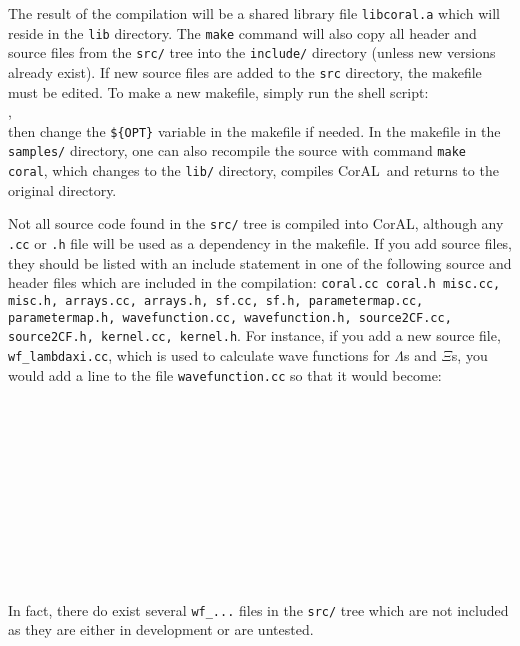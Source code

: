 \documentclass[10pt]{article}
\def\tab{\hspace*{9pt}}
\newcommand{\coral}{CorAL}
\begin{document}
The result of the compilation will be a shared library file {\tt libcoral.a} which will reside in the {\tt lib} directory. The {\tt make} command will also copy all header and source files from the {\tt src/} tree into the {\tt include/} directory (unless new versions already exist). If new source files are added to the {\tt src} directory, the makefile must be edited. To make a new makefile, simply run the shell script:\\
\tab {\tt makemaker.sh > makefile},\\
then change the {\tt \$\{OPT\}} variable in the makefile if needed. In the makefile in the {\tt samples/} directory, one can also recompile the source with command {\tt make coral}, which changes to the {\tt lib/} directory, compiles \coral\ and returns to the original directory.

Not all source code found in the {\tt src/} tree is compiled into \coral, although any {\tt *.cc} or {\tt *.h} file will be used as a dependency in the makefile. If you add source files, they should be listed with an include statement in one of the following source and header files which are included in the compilation: {\tt coral.cc \tt coral.h \tt misc.cc, misc.h, arrays.cc, arrays.h, sf.cc, sf.h, parametermap.cc, parametermap.h, wavefunction.cc, wavefunction.h, source2CF.cc, source2CF.h, kernel.cc, kernel.h}. For instance, if you add a new source file, {\tt wf\_lambdaxi.cc}, which is used to calculate wave functions for $\Lambda$s and $\Xi$s, you would add a line to the  file {\tt wavefunction.cc} so that it would become:\\
\tab {\tt \#include "wavefunction.h"}\\
\tab {\tt \#include "wfcommon.cc"}\\
\tab {\tt \#include "planewave.cc"}\\
\tab {\tt \#include "partwave.cc"}\\
\tab {\tt \#include "pipi\_phaseshifts.cc"}\\
\tab {\tt \#include "wf\_pp.cc"}\\
\tab {\tt \#include "wf\_pkplus.cc"}\\
\tab {\tt \#include "wf\_pipluspiplus.cc"}\\
\tab {\tt \#include "wf\_pipluspiminus.cc"}\\
\tab {\tt \#include "wf\_nn.cc"}\\
\tab {\tt \#include "wf\_lambdaxi.cc}\\
In fact, there do exist several {\tt wf\_...} files in the {\tt src/} tree which are not included as they are either in development or are untested.
\end{document}
